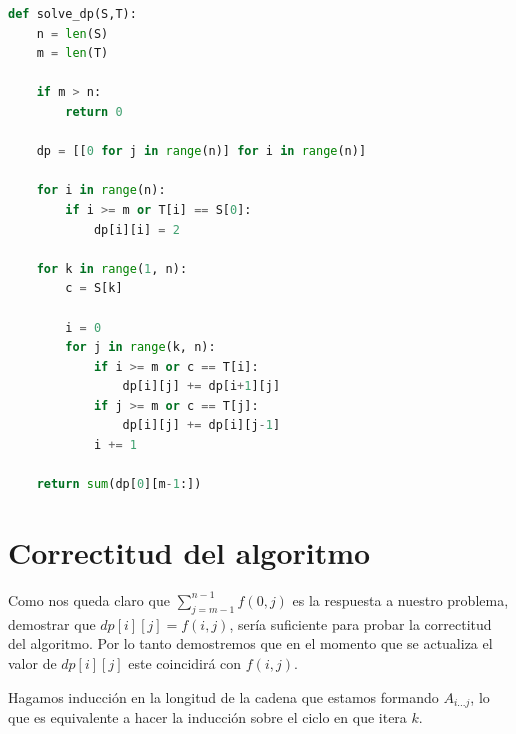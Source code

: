 \documentclass[a4paper]{article}
\begin{document}
    
    \begin{lstlisting}[language=Python]
def solve_dp(S,T):
    n = len(S)
    m = len(T)
        
    if m > n:
        return 0
        
    dp = [[0 for j in range(n)] for i in range(n)]
    
    for i in range(n):
        if i >= m or T[i] == S[0]:
            dp[i][i] = 2
    
    for k in range(1, n):    
        c = S[k]
        
        i = 0        
        for j in range(k, n):
            if i >= m or c == T[i]:
                dp[i][j] += dp[i+1][j]
            if j >= m or c == T[j]:
                dp[i][j] += dp[i][j-1]            
            i += 1            
    
    return sum(dp[0][m-1:])
    \end{lstlisting}
	
	\section*{Correctitud del algoritmo}
	
	Como nos queda claro que $\sum_{j= m-1}^{n-1}f(0,j)$ es la respuesta a nuestro problema, demostrar que $dp[i][j] = f(i,j)$, sería suficiente para probar la correctitud del algoritmo. Por lo tanto demostremos que en el momento que se actualiza el valor de $dp[i][j]$ este coincidirá con $f(i,j)$.
	
	Hagamos inducción en la longitud de la cadena que estamos formando $A_{i...j}$, lo que es equivalente a hacer la inducción sobre el ciclo en que itera $k$.
	
\end{document}
